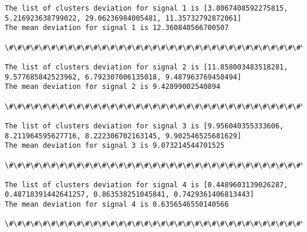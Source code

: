 \documentclass[11pt]{article}
\begin{document}
    \begin{Verbatim}[commandchars=\\\{\}]
The list of clusters deviation for signal 1 is [3.8067408592275815, 5.216923638799022, 29.06236984005481, 11.35732792872061]
The mean deviation for signal 1 is 12.360840566700507 

\#\#\#\#\#\#\#\#\#\#\#\#\#\#\#\#\#\#\#\#\#\#\#\#\#\#\#\#\#\#\#\#\#\#\#\#\#\#\#\#\#\#\#\#\#\#\#\#\#\#\#\#\#\#\#\#\#\#\#\#\#\#\#\#\#\#\#\#\#\#\#\#\#\#\#\#\#\#\#\#\#

The list of clusters deviation for signal 2 is [11.858003483518281, 9.577685842523962, 6.792307006135018, 9.487963769458494]
The mean deviation for signal 2 is 9.42899002540894 

\#\#\#\#\#\#\#\#\#\#\#\#\#\#\#\#\#\#\#\#\#\#\#\#\#\#\#\#\#\#\#\#\#\#\#\#\#\#\#\#\#\#\#\#\#\#\#\#\#\#\#\#\#\#\#\#\#\#\#\#\#\#\#\#\#\#\#\#\#\#\#\#\#\#\#\#\#\#\#\#\#

The list of clusters deviation for signal 3 is [9.956040355333606, 8.211964595627716, 8.222306702163145, 9.902546525681629]
The mean deviation for signal 3 is 9.073214544701525 

\#\#\#\#\#\#\#\#\#\#\#\#\#\#\#\#\#\#\#\#\#\#\#\#\#\#\#\#\#\#\#\#\#\#\#\#\#\#\#\#\#\#\#\#\#\#\#\#\#\#\#\#\#\#\#\#\#\#\#\#\#\#\#\#\#\#\#\#\#\#\#\#\#\#\#\#\#\#\#\#\#

The list of clusters deviation for signal 4 is [0.4489603139026287, 0.48718391442641257, 0.863538251045841, 0.7429361406813443]
The mean deviation for signal 4 is 0.6356546550140566 

\#\#\#\#\#\#\#\#\#\#\#\#\#\#\#\#\#\#\#\#\#\#\#\#\#\#\#\#\#\#\#\#\#\#\#\#\#\#\#\#\#\#\#\#\#\#\#\#\#\#\#\#\#\#\#\#\#\#\#\#\#\#\#\#\#\#\#\#\#\#\#\#\#\#\#\#\#\#\#\#\#


    \end{Verbatim}


    
    
    
    
\end{document}
